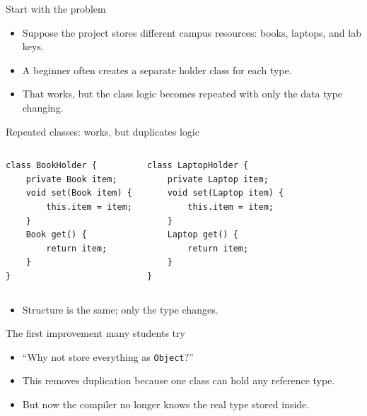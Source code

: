 \documentclass{beamer}
\begin{document}
\begin{frame}{Start with the problem}
  \begin{itemize}[<+->]
    \item Suppose the project stores different campus resources: books, laptops, and lab keys.
    \item A beginner often creates a separate holder class for each type.
    \item That works, but the class logic becomes repeated with only the data type changing.
  \end{itemize}
  \slidesources{\OOPSUnitIVSources}
\end{frame}

\begin{frame}[fragile]{Repeated classes: works, but duplicates logic}
\begin{columns}[T]
\begin{lstlisting}
class BookHolder {
    private Book item;
    void set(Book item) {
        this.item = item;
    }
    Book get() {
        return item;
    }
}
\end{lstlisting}
\begin{lstlisting}
class LaptopHolder {
    private Laptop item;
    void set(Laptop item) {
        this.item = item;
    }
    Laptop get() {
        return item;
    }
}
\end{lstlisting}
\end{columns}
\vspace{0.4em}
\begin{itemize}[<+->]
  \item Structure is the same; only the type changes.
\end{itemize}
  \slidesources{\OOPSUnitIVSources}
\end{frame}

\begin{frame}{The first improvement many students try}
  \begin{itemize}[<+->]
    \item ``Why not store everything as \texttt{Object}?'' 
    \item This removes duplication because one class can hold any reference type.
    \item But now the compiler no longer knows the real type stored inside.
  \end{itemize}
  \slidesources{\OOPSUnitIVSources}
\end{frame}
\end{document}
